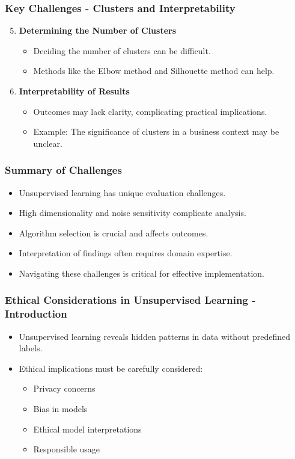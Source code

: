 \documentclass[aspectratio=169]{beamer}
\begin{document}
\begin{frame}[fragile]
    \frametitle{Key Challenges - Clusters and Interpretability}
    \begin{enumerate}
        \setcounter{enumi}{4}
        \item \textbf{Determining the Number of Clusters}
        \begin{itemize}
            \item Deciding the number of clusters can be difficult.
            \item Methods like the Elbow method and Silhouette method can help.
        \end{itemize}

        \item \textbf{Interpretability of Results}
        \begin{itemize}
            \item Outcomes may lack clarity, complicating practical implications.
            \item Example: The significance of clusters in a business context may be unclear.
        \end{itemize}
    \end{enumerate}
\end{frame}

\begin{frame}[fragile]
    \frametitle{Summary of Challenges}
    \begin{itemize}
        \item Unsupervised learning has unique evaluation challenges.
        \item High dimensionality and noise sensitivity complicate analysis.
        \item Algorithm selection is crucial and affects outcomes.
        \item Interpretation of findings often requires domain expertise.
        \item Navigating these challenges is critical for effective implementation.
    \end{itemize}
\end{frame}

\begin{frame}[fragile]
    \frametitle{Ethical Considerations in Unsupervised Learning - Introduction}
    \begin{itemize}
        \item Unsupervised learning reveals hidden patterns in data without predefined labels.
        \item Ethical implications must be carefully considered:
        \begin{itemize}
            \item Privacy concerns
            \item Bias in models
            \item Ethical model interpretations
            \item Responsible usage
        \end{itemize}
    \end{itemize}
\end{frame}
\end{document}

